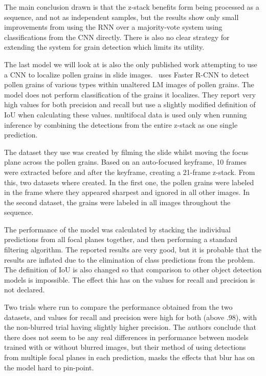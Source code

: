 The main conclusion drawn is that the z-stack benefits form being processed as a sequence, and not as independent samples, but the results show only small improvements from using the RNN over a majority-vote system using classifications from the CNN directly.
There is also no clear strategy for extending the system for grain detection which limits its utility.

The last model we will look at is also the only published work attempting to use a CNN to localize pollen grains in slide images.\ \textcite{gallardo_caballero_precise_2019} uses Faster R-CNN to detect pollen grains of various types within unaltered LM images of pollen grains.
The model does not perform classification of the grains it localizes.
They report very high values for both precision and recall but use a slightly modified definition of IoU when calculating these values.
multifocal data is used only when running inference by combining the detections from the entire z-stack as one single prediction.

The dataset they use was created by filming the slide whilst moving the focus plane across the pollen grains.
Based on an auto-focused keyframe, 10 frames were extracted before and after the keyframe, creating a 21-frame z-stack.
From this, two datasets where created.
In the first one, the pollen grains were labeled in the frame where they appeared sharpest and ignored in all other images.
In the second dataset, the grains were labeled in all images throughout the sequence.

The performance of the model was calculated by stacking the individual predictions from all focal planes together, and then performing a standard filtering algorithm.
The reported results are very good, but it is probable that the results are inflated due to the elimination of class predictions from the problem.
The definition of IoU is also changed so that comparison to other object detection models is impossible.
The effect this has on the values for recall and precision is not declared.

Two trials where run to compare the performance obtained from the two datasets, and values for recall and precision were high for both (above .98), with the non-blurred trial having slightly higher precision.
The authors conclude that there does not seem to be any real differences in performance between models trained with or without blurred images, but their method of using detections from multiple focal planes in each prediction, masks the effects that blur has on the model hard to pin-point.

